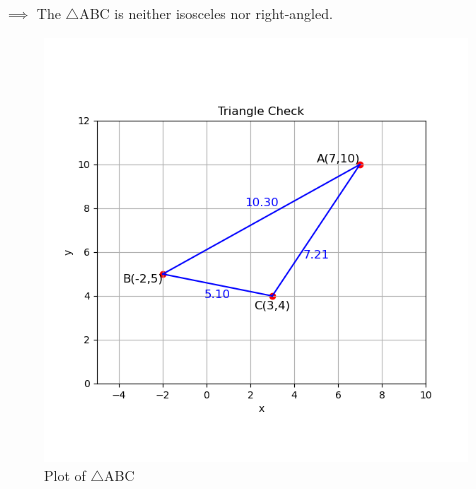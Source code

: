 \documentclass[journal]{IEEEtran}
\begin{document}
$\implies$ The $\triangle$ABC is neither isosceles nor right-angled.

\begin{figure}[h!]
   \centering
   \includegraphics[width=0.5\linewidth]{figs/01.png}
   \caption{Plot of $\triangle$ABC}
   \label{Plot_1}
\end{figure}
\end{document}
